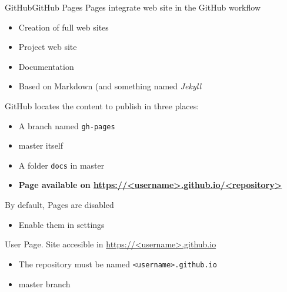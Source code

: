 \documentclass[10pt,compress]{beamer} %
\begin{document}
\begin{frame}{GitHub}{GitHub Pages}
	Pages integrate web site in the GitHub workflow
	\begin{itemize}
		\item Creation of full web sites
		\item Project web site
		\item Documentation
		\item Based on Markdown (and something named \textit{Jekyll}
	\end{itemize}

	GitHub locates the content to publish in three places:
	\begin{itemize}
		\item A branch named \texttt{gh-pages}
		\item master itself
		\item A folder \texttt{docs} in master
		\item \textbf{Page available on \url{https://<username>.github.io/<repository>}}
	\end{itemize}

	By default, Pages are disabled 
	\begin{itemize}
		\item Enable them in settings
	\end{itemize}

	User Page. Site accesible in \url{https://<username>.github.io}
	\begin{itemize}
		\item The repository must be named \texttt{<username>.github.io}
		\item master branch
	\end{itemize}
\end{frame}

%
%


\end{document}
